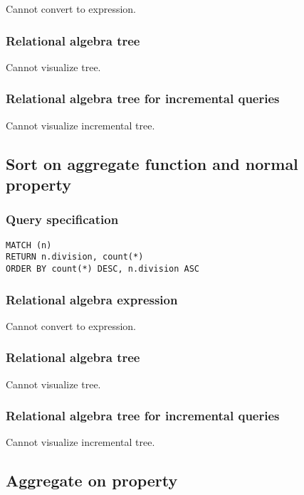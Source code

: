 Cannot convert to expression.

\subsubsection*{Relational algebra tree}

Cannot visualize tree.

\subsubsection*{Relational algebra tree for incremental queries}

Cannot visualize incremental tree.

\subsection{Sort on aggregate function and normal property}

\subsubsection*{Query specification}

\begin{lstlisting}
MATCH (n)
RETURN n.division, count(*)
ORDER BY count(*) DESC, n.division ASC
\end{lstlisting}

\subsubsection*{Relational algebra expression}

Cannot convert to expression.

\subsubsection*{Relational algebra tree}

Cannot visualize tree.

\subsubsection*{Relational algebra tree for incremental queries}

Cannot visualize incremental tree.

\subsection{Aggregate on property}

